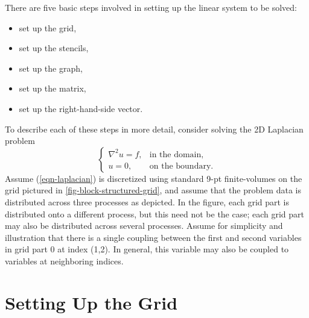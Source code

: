 There are five basic steps involved in setting up the linear system to
be solved:
\begin{itemize}
\item set up the grid,
\item set up the stencils,
\item set up the graph,
\item set up the matrix,
\item set up the right-hand-side vector.
\end{itemize}
To describe each of these steps in more detail, consider solving the
2D Laplacian problem
\begin{equation}\label{sstruct:eqn-laplacian}
\left \{
\begin{array}{ll}
\nabla^2 u = f , & \mbox{in the domain}, \\
u = 0,           & \mbox{on the boundary}.
\end{array}
\right .
\end{equation}
Assume (\ref{eqn-laplacian}) is discretized using standard 9-pt
finite-volumes on the grid pictured in
\ref{fig-block-structured-grid}, and assume that the problem data is
distributed across three processes as depicted.  In the figure, each
grid part is distributed onto a different process, but this need not
be the case; each grid part may also be distributed across several
processes.  Assume for simplicity and illustration that there is a
single coupling between the first and second variables in grid part 0
at index (1,2).  In general, this variable may also be coupled to
variables at neighboring indices.


\section{Setting Up the Grid}
\label{sstruct:Setting Up the Grid}

